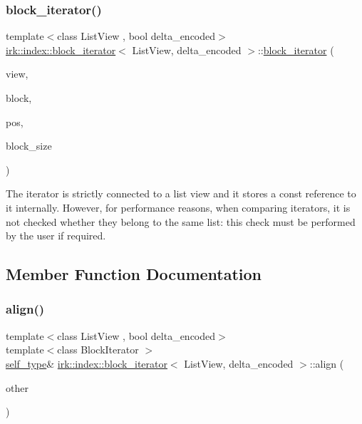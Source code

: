 \subsubsection{\texorpdfstring{block\+\_\+iterator()}{block\_iterator()}\hspace{0.1cm}{\footnotesize\ttfamily [3/3]}}
{\footnotesize\ttfamily template$<$class List\+View , bool delta\+\_\+encoded$>$ \\
\mbox{\hyperlink{classirk_1_1index_1_1block__iterator}{irk\+::index\+::block\+\_\+iterator}}$<$ List\+View, delta\+\_\+encoded $>$\+::\mbox{\hyperlink{classirk_1_1index_1_1block__iterator}{block\+\_\+iterator}} (\begin{DoxyParamCaption}\item[{const \mbox{\hyperlink{classirk_1_1index_1_1block__iterator_a75bc89b691db97f719af7284ee91afa0}{view\+\_\+type}} \&}]{view,  }\item[{\mbox{\hyperlink{classirk_1_1index_1_1block__iterator_abb90b6c7a6100113770359e6eb9dd8cf}{difference\+\_\+type}}}]{block,  }\item[{\mbox{\hyperlink{classirk_1_1index_1_1block__iterator_abb90b6c7a6100113770359e6eb9dd8cf}{difference\+\_\+type}}}]{pos,  }\item[{int}]{block\+\_\+size }\end{DoxyParamCaption})\hspace{0.3cm}{\ttfamily [inline]}}

The iterator is strictly connected to a list view and it stores a const reference to it internally. However, for performance reasons, when comparing iterators, it is not checked whether they belong to the same list\+: this check must be performed by the user if required. 

\subsection{Member Function Documentation}
\mbox{\label{classirk_1_1index_1_1block__iterator_a901a557c429c737587e30b123bfc1641}} 
\subsubsection{\texorpdfstring{align()}{align()}}
{\footnotesize\ttfamily template$<$class List\+View , bool delta\+\_\+encoded$>$ \\
template$<$class Block\+Iterator $>$ \\
\mbox{\hyperlink{classirk_1_1index_1_1block__iterator_a338ee8fee726492e9f8bbad4b4d75766}{self\+\_\+type}}\& \mbox{\hyperlink{classirk_1_1index_1_1block__iterator}{irk\+::index\+::block\+\_\+iterator}}$<$ List\+View, delta\+\_\+encoded $>$\+::align (\begin{DoxyParamCaption}\item[{const Block\+Iterator \&}]{other }\end{DoxyParamCaption})\hspace{0.3cm}{\ttfamily [inline]}}



